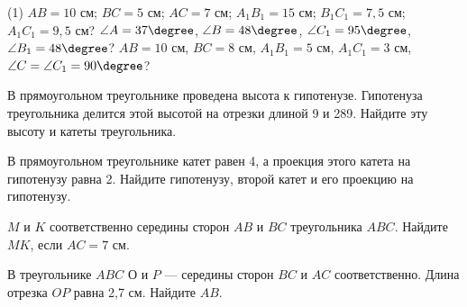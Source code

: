 \begin{class}[number=1]
\begin{listofex}
		\begin{tasks}(1)
			\task \( AB = 10 \) см; \( BC = 5 \) см; \( AC = 7 \) см; \( A_1B_1 = 15 \) см; \( B_1C_1 = 7,5 \) см; \( A_1C_1 = 9,5 \) см?
			\task \( \angle A = 37\degree \), \( \angle B = 48\degree \), \( \angle C_1 = 95\degree \), \( \angle B_1 = 48\degree \)?
			\task 	\( AB = 10  \) см, \( BC = 8 \) см, \( A_1B_1 = 5 \) см, \( A_1C_1 = 3 \) см, \( \angle C = \angle C_1 = 90\degree \)?
		\end{tasks}
		\item В прямоугольном треугольнике проведена высота к гипотенузе. Гипотенуза треугольника делится этой высотой на отрезки длиной 9 и 289. Найдите эту высоту и катеты треугольника.
		\item В прямоугольном треугольнике катет равен 4, а проекция этого катета на гипотенузу равна 2. Найдите гипотенузу, второй катет и его проекцию на гипотенузу.
		\item \( M \) и \( K \) соответственно середины сторон \( AB \) и \( BC \) треугольника \( ABC \). Найдите \( MK \), если \( AC = 7 \) см.
		\item В треугольнике \( ABC \) \( О \) и \( P \) --- середины сторон \( BC \) и \( AC \) соответственно. Длина отрезка \( OP \) равна 2,7 см. Найдите \( AB \).
		
	
	\end{listofex}
\end{class}

